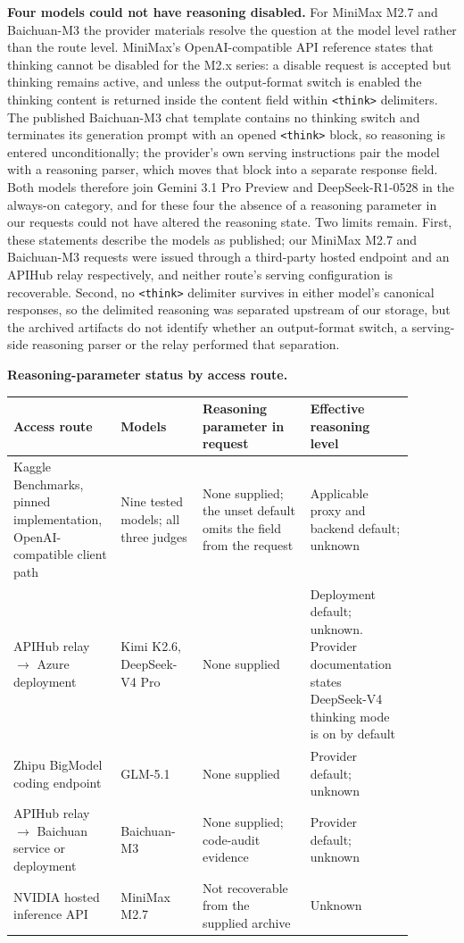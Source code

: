 \documentclass[10pt]{article}
\begin{document}
\textbf{Four models could not have reasoning disabled.} For MiniMax M2.7 and Baichuan-M3
the provider materials resolve the question at the model level rather than the route level.
MiniMax's OpenAI-compatible API reference states that thinking cannot be disabled for the
M2.x series: a disable request is accepted but thinking remains active, and unless the
output-format switch is enabled the thinking content is returned inside the content field
within \texttt{<think>} delimiters. The published Baichuan-M3 chat template contains no
thinking switch and terminates its generation prompt with an opened \texttt{<think>} block,
so reasoning is entered unconditionally; the provider's own serving instructions pair the
model with a reasoning parser, which moves that block into a separate response field. Both
models therefore join Gemini 3.1 Pro Preview and DeepSeek-R1-0528 in the always-on
category, and for these four the absence of a reasoning parameter in our requests could not
have altered the reasoning state. Two limits remain. First, these statements describe the
models as published; our MiniMax M2.7 and Baichuan-M3 requests were issued through a
third-party hosted endpoint and an APIHub relay respectively, and neither route's
serving configuration is recoverable. Second, no \texttt{<think>} delimiter survives in
either model's canonical responses, so the delimited reasoning was separated upstream of
our storage, but the archived artifacts do not identify whether an output-format switch, a
serving-side reasoning parser or the relay performed that separation.

\medskip
\noindent\textbf{Reasoning-parameter status by access route.}

{\footnotesize
\setlength{\tabcolsep}{4pt}
\begin{longtable}{>{\raggedright\arraybackslash}p{0.21\linewidth}>{\raggedright\arraybackslash}p{0.19\linewidth}>{\raggedright\arraybackslash}p{0.25\linewidth}>{\raggedright\arraybackslash}p{0.24\linewidth}}
\toprule
\textbf{Access route} & \textbf{Models} & \textbf{Reasoning parameter in request} & \textbf{Effective reasoning level} \\
\midrule
\endhead
Kaggle Benchmarks, pinned implementation, OpenAI-compatible client path & Nine tested models; all three judges & None supplied; the unset default omits the field from the request & Applicable proxy and backend default; unknown \\
APIHub relay $\rightarrow$ Azure deployment & Kimi K2.6, DeepSeek-V4 Pro & None supplied & Deployment default; unknown. Provider documentation states DeepSeek-V4 thinking mode is on by default \\
Zhipu BigModel coding endpoint & GLM-5.1 & None supplied & Provider default; unknown \\
APIHub relay $\rightarrow$ Baichuan service or deployment & Baichuan-M3 & None supplied; code-audit evidence & Provider default; unknown \\
NVIDIA hosted inference API & MiniMax M2.7 & Not recoverable from the supplied archive & Unknown \\
\bottomrule
\end{longtable}}
\end{document}

